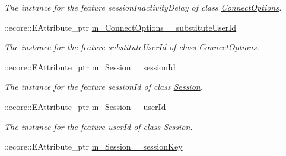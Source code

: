 \begin{DoxyCompactItemize}
\begin{DoxyCompactList}\small\item\em The instance for the feature sessionInactivityDelay of class \hyperlink{classUMS__Data_1_1ConnectOptions}{ConnectOptions}. \item\end{DoxyCompactList}\item 
\hypertarget{classUMS__Data_1_1UMS__DataPackage_a3bc3f7f17e0372a8491c73ea45335147}{
::ecore::EAttribute\_\-ptr \hyperlink{classUMS__Data_1_1UMS__DataPackage_a3bc3f7f17e0372a8491c73ea45335147}{m\_\-ConnectOptions\_\-\_\-substituteUserId}}
\label{classUMS__Data_1_1UMS__DataPackage_a3bc3f7f17e0372a8491c73ea45335147}

\begin{DoxyCompactList}\small\item\em The instance for the feature substituteUserId of class \hyperlink{classUMS__Data_1_1ConnectOptions}{ConnectOptions}. \item\end{DoxyCompactList}\item 
\hypertarget{classUMS__Data_1_1UMS__DataPackage_a0473c0704c5c459f1b78755a141b198b}{
::ecore::EAttribute\_\-ptr \hyperlink{classUMS__Data_1_1UMS__DataPackage_a0473c0704c5c459f1b78755a141b198b}{m\_\-Session\_\-\_\-sessionId}}
\label{classUMS__Data_1_1UMS__DataPackage_a0473c0704c5c459f1b78755a141b198b}

\begin{DoxyCompactList}\small\item\em The instance for the feature sessionId of class \hyperlink{classUMS__Data_1_1Session}{Session}. \item\end{DoxyCompactList}\item 
\hypertarget{classUMS__Data_1_1UMS__DataPackage_adab9a58e38640b484d0df5949fd6cb11}{
::ecore::EAttribute\_\-ptr \hyperlink{classUMS__Data_1_1UMS__DataPackage_adab9a58e38640b484d0df5949fd6cb11}{m\_\-Session\_\-\_\-userId}}
\label{classUMS__Data_1_1UMS__DataPackage_adab9a58e38640b484d0df5949fd6cb11}

\begin{DoxyCompactList}\small\item\em The instance for the feature userId of class \hyperlink{classUMS__Data_1_1Session}{Session}. \item\end{DoxyCompactList}\item 
\hypertarget{classUMS__Data_1_1UMS__DataPackage_a41ff052c11327c88bfa812b0be8b65d8}{
::ecore::EAttribute\_\-ptr \hyperlink{classUMS__Data_1_1UMS__DataPackage_a41ff052c11327c88bfa812b0be8b65d8}{m\_\-Session\_\-\_\-sessionKey}}
\label{classUMS__Data_1_1UMS__DataPackage_a41ff052c11327c88bfa812b0be8b65d8}


\end{DoxyCompactItemize}
